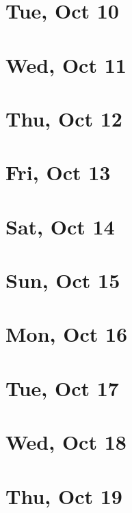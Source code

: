 	\section{Tue, Oct 10}
		
	\section{Wed, Oct 11}
		
	\section{Thu, Oct 12}
		
	\section{Fri, Oct 13}
		
	\section{Sat, Oct 14}
		
	\section{Sun, Oct 15}
		
	\section{Mon, Oct 16}
		
	\section{Tue, Oct 17}
		
	\section{Wed, Oct 18}
		
	\section{Thu, Oct 19}
		

